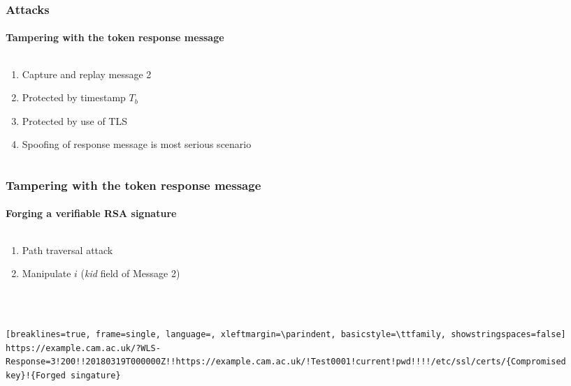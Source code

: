 \documentclass[handout, aspectratio=169, notes=hide]{beamer}
\begin{document}

\begin{frame}
\frametitle{Attacks}
\framesubtitle{Tampering with the token response message}
\setlength{\parskip}{1.0em}
\begin{columns}[T]
\begin{column}[T]{1.0\textwidth}	
\setlength{\parskip}{1.0em}

\begin{enumerate}
\setlength{\parskip}{1.0em}
\item Capture and replay message 2
\item Protected by timestamp $T_b$
\item Protected by use of TLS
\item Spoofing of response message is most serious scenario
\end{enumerate}
\end{column}

\begin{column}[T]{0.0\textwidth}
\end{column}
\end{columns}

\end{frame}
\note{
}


\begin{frame}[fragile]
\frametitle{Tampering with the token response message}
\framesubtitle{Forging a verifiable RSA signature}
\setlength{\parskip}{1.0em}
\begin{columns}[T]
\begin{column}[T]{1.0\textwidth}	
\setlength{\parskip}{1.0em}

\begin{enumerate}
\setlength{\parskip}{1.0em}
\item Path traversal attack
\item Manipulate $i$ ({\it kid\/} field of Message 2)
\end{enumerate}
\quad \\ \quad \\
\begin{lstlisting}[breaklines=true, frame=single, language=, xleftmargin=\parindent, basicstyle=\ttfamily, showstringspaces=false]
https://example.cam.ac.uk/?WLS-Response=3!200!!20180319T000000Z!!https://example.cam.ac.uk/!Test0001!current!pwd!!!!/etc/ssl/certs/{Compromised key}!{Forged singature}
\end{lstlisting}
\end{column}

\begin{column}[T]{0.0\textwidth}
\end{column}
\end{columns}

\end{frame}
\note{
}
\end{document}

